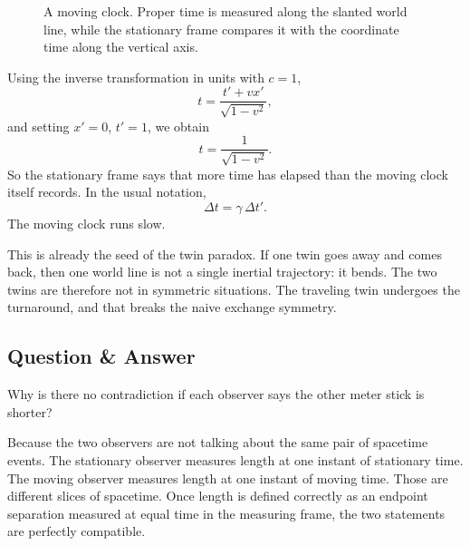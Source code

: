 \begin{figure}
\centering
{}
\caption{A moving clock. Proper time is measured along the slanted world line, while the stationary frame compares it with the coordinate time along the vertical axis.}
\end{figure}

Using the inverse transformation in units with \(c=1\),
\begin{equation}
t=\frac{t'+vx'}{\sqrt{1-v^2}},
\end{equation}
and setting \(x'=0\), \(t'=1\), we obtain
\begin{equation}
t=\frac{1}{\sqrt{1-v^2}}.
\end{equation}
So the stationary frame says that more time has elapsed than the moving clock itself records. In the usual notation,
\begin{equation}
\Delta t=\gamma\,\Delta t'.
\end{equation}
The moving clock runs slow.

This is already the seed of the twin paradox. If one twin goes away and comes back, then one world line is not a single inertial trajectory: it bends. The two twins are therefore not in symmetric situations. The traveling twin undergoes the turnaround, and that breaks the naive exchange symmetry.

\subsection{Question \& Answer}

Why is there no contradiction if each observer says the other meter stick is shorter?

Because the two observers are not talking about the same pair of spacetime events. The stationary observer measures length at one instant of stationary time. The moving observer measures length at one instant of moving time. Those are different slices of spacetime. Once length is defined correctly as an endpoint separation measured at equal time in the measuring frame, the two statements are perfectly compatible.

